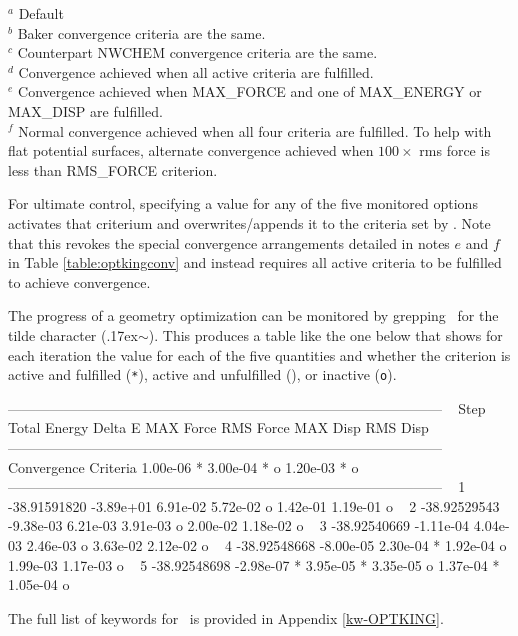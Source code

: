 \begin{table}[!htbp]
\begin{footnotesize}
\begin{center}
\end{center}
$^a$ Default \\
$^b$ Baker convergence criteria are the same. \\
$^c$ Counterpart NWCHEM convergence criteria are the same. \\
$^d$ Convergence achieved when all active criteria are fulfilled. \\
$^e$ Convergence achieved when MAX\_FORCE and one of MAX\_ENERGY or MAX\_DISP are fulfilled. \\
$^f$ Normal convergence achieved when all four criteria are fulfilled. To help with flat potential surfaces, alternate convergence achieved when $100\times$ rms force is less than RMS\_FORCE criterion.
\end{footnotesize}
\end{table}

For ultimate control, specifying a value for any of the five monitored options activates that
criterium and overwrites/appends it to the criteria set by .
Note that this revokes the special convergence arrangements detailed in notes $e$ and $f$ in 
Table \ref{table:optkingconv} and instead requires all active criteria to be fulfilled to 
achieve convergence.

The progress of a geometry optimization can be monitored by grepping \outputdat\ for the
tilde character ({\raise.17ex\hbox{$\scriptstyle\sim$}}). This produces a table like the one below that shows
for each iteration the value for each of the five quantities and whether the criterion
is active and fulfilled (\texttt{*}), active and unfulfilled (\texttt{\;\;}), or inactive (\texttt{o}).
\begin{scriptsize}
\begin{Snippet}
--------------------------------------------------------------------------------------------- ~
 Step     Total Energy     Delta E     MAX Force     RMS Force      MAX Disp      RMS Disp    ~
--------------------------------------------------------------------------------------------- ~
  Convergence Criteria    1.00e-06 *    3.00e-04 *             o    1.20e-03 *             o  ~
--------------------------------------------------------------------------------------------- ~
    1     -38.91591820   -3.89e+01      6.91e-02      5.72e-02 o    1.42e-01      1.19e-01 o  ~
    2     -38.92529543   -9.38e-03      6.21e-03      3.91e-03 o    2.00e-02      1.18e-02 o  ~
    3     -38.92540669   -1.11e-04      4.04e-03      2.46e-03 o    3.63e-02      2.12e-02 o  ~
    4     -38.92548668   -8.00e-05      2.30e-04 *    1.92e-04 o    1.99e-03      1.17e-03 o  ~
    5     -38.92548698   -2.98e-07 *    3.95e-05 *    3.35e-05 o    1.37e-04 *    1.05e-04 o  ~
\end{Snippet}
\end{scriptsize}

The full list of keywords for \PSIoptking\ is provided in Appendix \ref{kw-OPTKING}.

